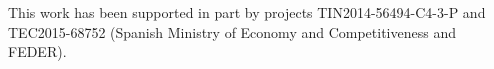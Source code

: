 \documentclass{article}
\begin{document}
This work has been supported in part by projects TIN2014-56494-C4-3-P and TEC2015-68752 (Spanish Ministry of Economy and Competitiveness and FEDER).











\end{document}
